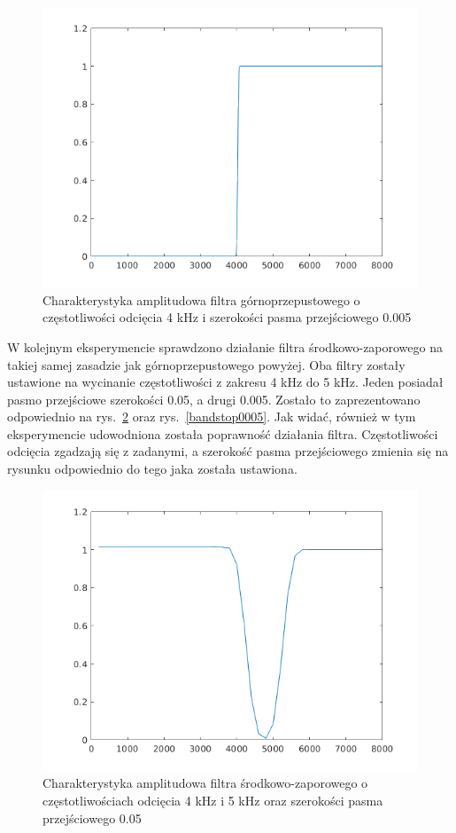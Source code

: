 \begin{figure}
\centering
\includegraphics{dane/highpass0005.png} %
\caption{Charakterystyka amplitudowa filtra górnoprzepustowego o częstotliwości odcięcia \num{4} kHz i szerokości pasma przejściowego \num{0.005}}
\label{highpass0005}
\end{figure}

W kolejnym eksperymencie sprawdzono działanie filtra środkowo-zaporowego na takiej samej zasadzie jak górnoprzepustowego powyżej.
Oba filtry zostały ustawione na wycinanie częstotliwości z zakresu \num{4} kHz do \num{5} kHz.
Jeden posiadał pasmo przejściowe szerokości \num{0.05}, a drugi \num{0.005}.
Zostało to zaprezentowano odpowiednio na rys.~\ref{bandstop005} oraz rys.~\ref{bandstop0005}.
Jak widać, również w tym eksperymencie udowodniona została poprawność działania filtra.
Częstotliwości odcięcia zgadzają się z zadanymi, a szerokość pasma przejściowego zmienia się na rysunku odpowiednio do tego jaka została ustawiona.

\begin{figure}
\centering
\includegraphics{dane/bandstop005.png} %
\caption{Charakterystyka amplitudowa filtra środkowo-zaporowego o częstotliwościach odcięcia \num{4} kHz i \num{5} kHz oraz szerokości pasma przejściowego \num{0.05}}
\label{bandstop005}
\end{figure}

